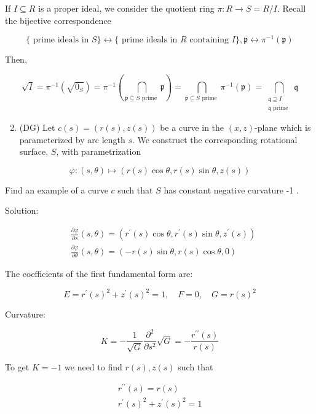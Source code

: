 \documentclass[10pt]{article}
\begin{document}
If $I \subseteq R$ is a proper ideal, we consider the quotient ring $\pi: R \rightarrow S=R / I$. Recall the bijective correspondence

$$
\{\text { prime ideals in } S\} \leftrightarrow\{\text { prime ideals in } R \text { containing } I\}, \mathfrak{p} \leftrightarrow \pi^{-1}(\mathfrak{p})
$$

Then,

$$
\sqrt{I}=\pi^{-1}\left(\sqrt{0_{S}}\right)=\pi^{-1}\left(\bigcap_{\mathfrak{p} \subseteq S \text { prime }} \mathfrak{p}\right)=\bigcap_{\mathfrak{p} \subseteq S \text { prime }} \pi^{-1}(\mathfrak{p})=\bigcap_{\substack{\mathfrak{q} \supseteq I \\ \mathfrak{q} \text { prime }}} \mathfrak{q}
$$

\begin{enumerate}
  \setcounter{enumi}{1}
  \item (DG) Let $c(s)=(r(s), z(s))$ be a curve in the $(x, z)$-plane which is parameterized by arc length $s$. We construct the corresponding rotational surface, $S$, with parametrization
\end{enumerate}

$$
\varphi:(s, \theta) \mapsto(r(s) \cos \theta, r(s) \sin \theta, z(s))
$$

Find an example of a curve $c$ such that $S$ has constant negative curvature -1 .

Solution:

$$
\begin{aligned}
& \frac{\partial \varphi}{\partial s}(s, \theta)=\left(r^{\prime}(s) \cos \theta, r^{\prime}(s) \sin \theta, z^{\prime}(s)\right) \\
& \frac{\partial \varphi}{\partial \theta}(s, \theta)=(-r(s) \sin \theta, r(s) \cos \theta, 0)
\end{aligned}
$$

The coefficients of the first fundamental form are:

$$
E=r^{\prime}(s)^{2}+z^{\prime}(s)^{2}=1, \quad F=0, \quad G=r(s)^{2}
$$

Curvature:

$$
K=-\frac{1}{\sqrt{G}} \frac{\partial^{2}}{\partial s^{2}} \sqrt{G}=-\frac{r^{\prime \prime}(s)}{r(s)}
$$

To get $K=-1$ we need to find $r(s), z(s)$ such that

$$
\begin{gathered}
r^{\prime \prime}(s)=r(s) \\
r^{\prime}(s)^{2}+z^{\prime}(s)^{2}=1
\end{gathered}
$$
\end{document}
